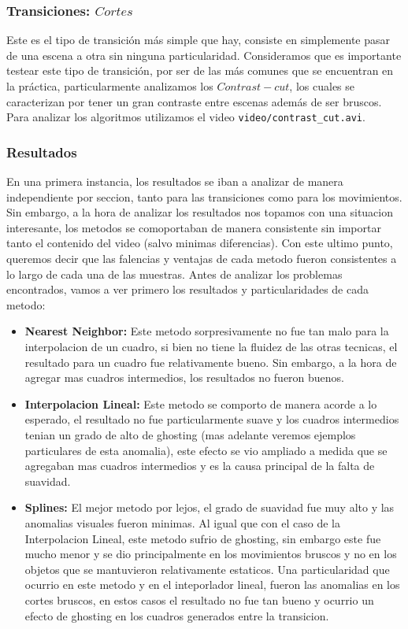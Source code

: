 \subsubsection{Transiciones: $Cortes$}

Este es el tipo de transición más simple que hay, consiste en simplemente pasar de una escena a otra sin ninguna particularidad. Consideramos que es importante testear este tipo de transición, por ser de las más comunes que se encuentran en la práctica, particularmente analizamos los $Contrast-cut$, los cuales se caracterizan por tener un gran contraste entre escenas además de ser bruscos. Para analizar los algoritmos utilizamos el video \texttt{video/contrast\_cut.avi}.

\subsubsection{Resultados}

En una primera instancia, los resultados se iban a analizar de manera independiente por seccion, tanto para las transiciones como para los movimientos. Sin embargo, a la hora de analizar los resultados nos topamos con una situacion interesante, los metodos se comoportaban de manera consistente sin importar tanto el contenido del video (salvo minimas diferencias). Con este ultimo punto, queremos decir que las falencias y ventajas de cada metodo fueron consistentes a lo largo de cada una de las muestras. Antes de analizar los problemas encontrados, vamos a ver primero los resultados y particularidades de cada metodo:

\begin{itemize}
	\item \textbf{Nearest Neighbor:} Este metodo sorpresivamente no fue tan malo para la interpolacion de un cuadro, si bien no tiene la fluidez de las otras tecnicas, el resultado para un cuadro fue relativamente bueno. Sin embargo, a la hora de agregar mas cuadros intermedios, los resultados no fueron buenos.
	\item \textbf{Interpolacion Lineal:} Este metodo se comporto de manera acorde a lo esperado, el resultado no fue particularmente suave y los cuadros intermedios tenian un grado de alto de ghosting (mas adelante veremos ejemplos particulares de esta anomalia), este efecto se vio ampliado a medida que se agregaban mas cuadros intermedios y es la causa principal de la falta de suavidad.
	\item \textbf{Splines:} El mejor metodo por lejos, el grado de suavidad fue muy alto y las anomalias visuales fueron minimas. Al igual que con el caso de la Interpolacion Lineal, este metodo sufrio de ghosting, sin embargo este fue mucho menor y se dio principalmente en los movimientos bruscos y no en los objetos que se mantuvieron relativamente estaticos. Una particularidad que ocurrio en este metodo y en el inteporlador lineal, fueron las anomalias en los cortes bruscos, en estos casos el resultado no fue tan bueno y ocurrio un efecto de ghosting en los cuadros generados entre la transicion.
\end{itemize}

